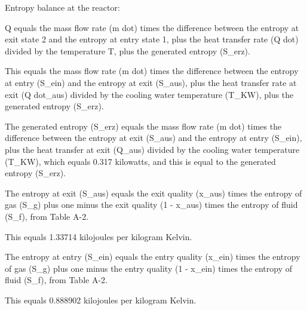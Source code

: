 Entropy balance at the reactor:

Q equals the mass flow rate (m dot) times the difference between the entropy at exit state 2 and the entropy at entry state 1, plus the heat transfer rate (Q dot) divided by the temperature T, plus the generated entropy (S_erz).

This equals the mass flow rate (m dot) times the difference between the entropy at entry (S_ein) and the entropy at exit (S_aus), plus the heat transfer rate at exit (Q dot_aus) divided by the cooling water temperature (T_KW), plus the generated entropy (S_erz).

The generated entropy (S_erz) equals the mass flow rate (m dot) times the difference between the entropy at exit (S_aus) and the entropy at entry (S_ein), plus the heat transfer at exit (Q_aus) divided by the cooling water temperature (T_KW), which equals 0.317 kilowatts, and this is equal to the generated entropy (S_erz).

The entropy at exit (S_aus) equals the exit quality (x_aus) times the entropy of gas (S_g) plus one minus the exit quality (1 - x_aus) times the entropy of fluid (S_f), from Table A-2.

This equals 1.33714 kilojoules per kilogram Kelvin.

The entropy at entry (S_ein) equals the entry quality (x_ein) times the entropy of gas (S_g) plus one minus the entry quality (1 - x_ein) times the entropy of fluid (S_f), from Table A-2.

This equals 0.888902 kilojoules per kilogram Kelvin.